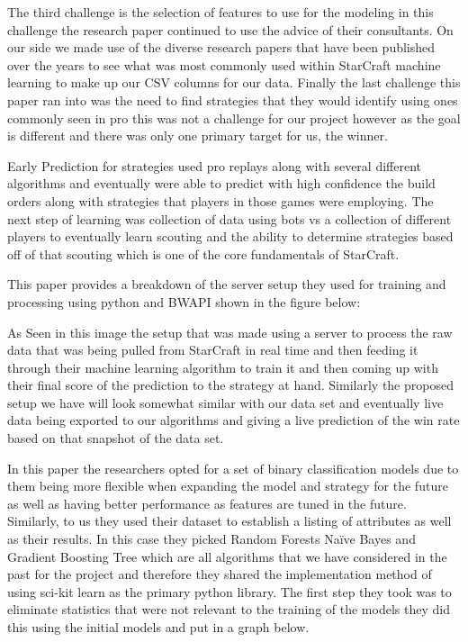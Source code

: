 \documentclass[a4paper,12pt]{report}
\begin{document}
The third challenge is the selection of features to use for the modeling in this challenge the research paper continued to use the advice of their consultants. On our side we made use of the diverse research papers that have been published over the years to see what was most commonly used within StarCraft machine learning to make up our CSV columns for our data. Finally the last challenge this paper ran into was the need to find strategies that they would identify using ones commonly seen in pro this was not a challenge for our project however as the goal is different and there was only one primary target for us, the winner.

Early Prediction for strategies used pro replays along with several different algorithms and eventually were able to predict with high confidence the build orders along with strategies that players in those games were employing. The next step of learning was collection of data using bots vs a collection of different players to eventually learn scouting and the ability to determine strategies based off of that scouting which is one of the core fundamentals of StarCraft.

This paper provides a breakdown of the server setup they used for training and processing using python and BWAPI shown in the figure below:


As Seen in this image the setup that was made using a server to process the raw data that was being pulled from StarCraft in real time and then feeding it through their machine learning algorithm to train it and then coming up with their final score of the prediction to the strategy at hand. Similarly the proposed setup we have will look somewhat similar with our data set and eventually live data being exported to our algorithms and giving a live prediction of the win rate based on that snapshot of the data set.

In this paper the researchers opted for a set of binary classification models due to them being more flexible when expanding the model and strategy for the future as well as having better performance as features are tuned in the future. Similarly, to us they used their dataset to establish a listing of attributes as well as their results. In this case they picked Random Forests Naïve Bayes and Gradient Boosting Tree which are all algorithms that we have considered in the past for the project and therefore they shared the implementation method of using sci-kit learn as the primary python library. The first step they took was to eliminate statistics that were not relevant to the training of the models they did this using the initial models and put in a graph below.
\end{document}
